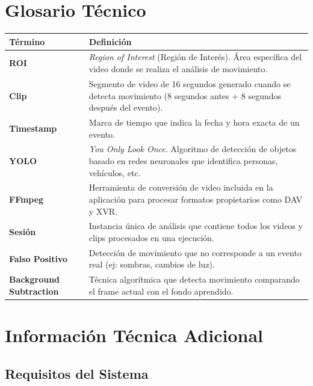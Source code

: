 \documentclass[11pt,a4paper]{article}
\begin{document}
\section{Glosario Técnico}

\begin{longtable}{|p{4cm}|p{10cm}|}
\hline
\textbf{Término} & \textbf{Definición} \\ \hline
\endhead

\textbf{ROI} & \textit{Region of Interest} (Región de Interés). Área específica del video donde se realiza el análisis de movimiento. \\ \hline

\textbf{Clip} & Segmento de video de 16 segundos generado cuando se detecta movimiento (8 segundos antes + 8 segundos después del evento). \\ \hline

\textbf{Timestamp} & Marca de tiempo que indica la fecha y hora exacta de un evento. \\ \hline

\textbf{YOLO} & \textit{You Only Look Once}. Algoritmo de detección de objetos basado en redes neuronales que identifica personas, vehículos, etc. \\ \hline

\textbf{FFmpeg} & Herramienta de conversión de video incluida en la aplicación para procesar formatos propietarios como DAV y XVR. \\ \hline

\textbf{Sesión} & Instancia única de análisis que contiene todos los videos y clips procesados en una ejecución. \\ \hline

\textbf{Falso Positivo} & Detección de movimiento que no corresponde a un evento real (ej: sombras, cambios de luz). \\ \hline

\textbf{Background Subtraction} & Técnica algorítmica que detecta movimiento comparando el frame actual con el fondo aprendido. \\ \hline
\end{longtable}

\section{Información Técnica Adicional}

\subsection{Requisitos del Sistema}
\end{document}
